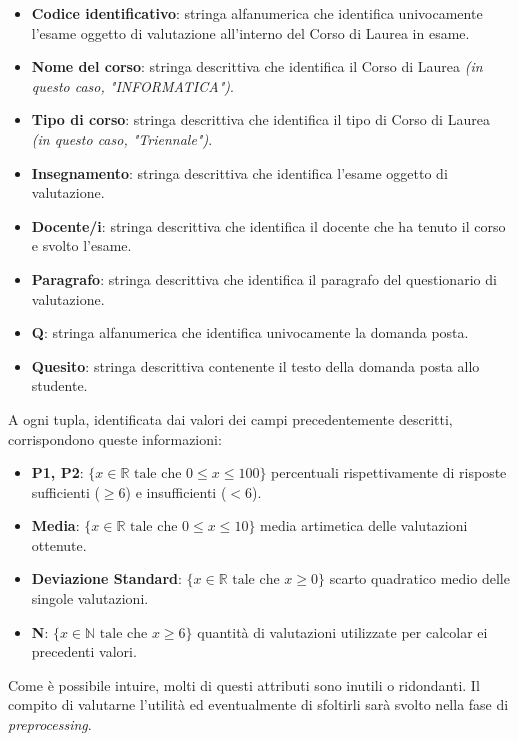 \begin{itemize}
	\item \textbf{Codice identificativo}: stringa alfanumerica che identifica univocamente l'esame oggetto di valutazione all'interno del Corso di Laurea in esame.
	\item \textbf{Nome del corso}: stringa descrittiva che identifica il Corso di Laurea \textit{(in questo caso, "INFORMATICA")}.
	\item \textbf{Tipo di corso}: stringa descrittiva che identifica il tipo di Corso di Laurea \textit{(in questo caso, "Triennale")}.
	\item \textbf{Insegnamento}: stringa descrittiva che identifica l'esame oggetto di valutazione.
	\item \textbf{Docente/i}: stringa descrittiva che identifica il docente che ha tenuto il corso e svolto l'esame.
	\item \textbf{Paragrafo}: stringa descrittiva che identifica il paragrafo del questionario di valutazione.
	\item \textbf{Q}: stringa alfanumerica che identifica univocamente la domanda posta.
	\item \textbf{Quesito}: stringa descrittiva contenente il testo della domanda posta allo studente.
\end{itemize}

\noindent A ogni tupla, identificata dai valori dei campi precedentemente descritti, corrispondono queste informazioni:

\begin{itemize}
	\item \textbf{P1, P2}: $ \{ x \in \mathbb{R} \text{ tale che } 0 \leq x \leq 100 \} $  percentuali rispettivamente di risposte sufficienti ($ \geq 6$) e insufficienti ($ < 6$).
	\item \textbf{Media}:  $ \{ x \in \mathbb{R} \text{ tale che } 0 \leq x \leq 10 \} $ media artimetica delle valutazioni ottenute.
	\item \textbf{Deviazione Standard}:  $ \{ x \in \mathbb{R} \text{ tale che } x \geq 0\} $ scarto quadratico medio delle singole valutazioni.
	\item \textbf{N}:  $ \{ x \in \mathbb{N} \text{ tale che } x \geq 6\} $ quantità di valutazioni utilizzate per calcolar ei precedenti valori.
\end{itemize}

Come è possibile intuire, molti di questi attributi sono inutili o ridondanti. Il compito di valutarne l'utilità ed eventualmente di sfoltirli sarà svolto nella fase di \textit{preprocessing}.


